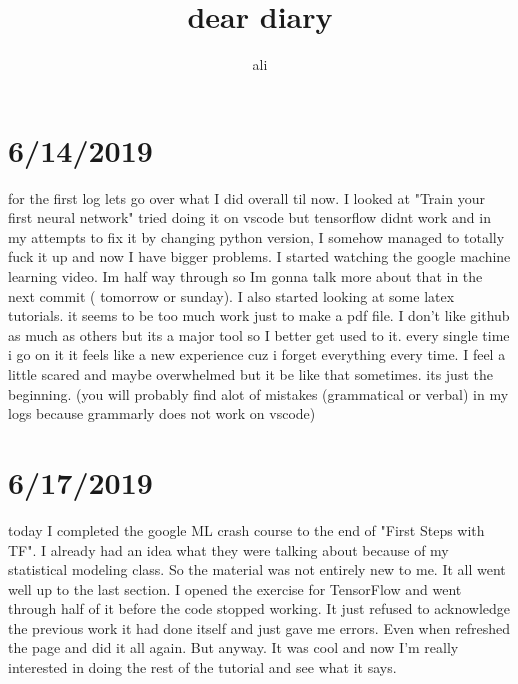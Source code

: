 \documentclass{article}
\begin{document}
 
\title{\LARGE{\textbf{dear diary}}}
\author{ali}
\maketitle
\newpage
\tableofcontents
\newpage

\section{6/14/2019}
for the first log lets go over what I did overall til now.
I looked at "Train your first neural network"
tried doing it on vscode but tensorflow didnt work and in my attempts to fix it by changing python version, 
I somehow managed to totally fuck it up and now I have bigger problems.
I started watching the google machine learning video. Im half way through so Im gonna talk more about that in the next commit ( tomorrow or sunday).
I also started looking at some latex tutorials. it seems to be too much work just to make a pdf file.
I don't like github as much as others but its a major tool so I better get used to it. every single time i go on it it feels like a new experience cuz i forget everything every time.
I feel a little scared and maybe overwhelmed but it be like that sometimes. its just the beginning.
(you will probably find alot of mistakes (grammatical or verbal) in my logs because grammarly does not work on vscode)

\section{6/17/2019}
today I completed the google ML crash course to the end of "First Steps with TF".
I already had an idea what they were talking about because of my statistical modeling class. So the material was not entirely new to me. 
It all went well up to the last section. I opened the exercise for TensorFlow and went through half of it before the code stopped working.
It just refused to acknowledge the previous work it had done itself and just gave me errors. Even when refreshed the page and did it all again.
But anyway. It was cool and now I’m really interested in doing the rest of the tutorial and see what it says.
\end{document}

